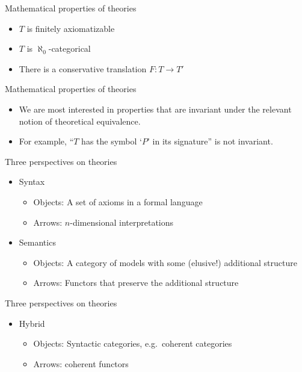\documentclass{beamer}
\begin{document}
\begin{frame}{Mathematical properties of theories}

  \begin{itemize}
  \item $T$ is finitely axiomatizable  
  \item $T$ is $\aleph _0$-categorical
  \item There is a conservative translation $F:T\to T'$
  \end{itemize}

\end{frame}

\begin{frame}{Mathematical properties of theories}

  \begin{itemize}
  \item We are most interested in properties that are invariant under
    the relevant notion of theoretical equivalence.
  \item For example, ``$T$ has the symbol `$P$' in its signature'' is
    not invariant.
  \end{itemize}

\end{frame}

\begin{frame}{Three perspectives on theories}

  \begin{itemize}
  \item Syntax
    \begin{itemize}
    \item Objects: A set of axioms in a formal language
    \item Arrows: $n$-dimensional interpretations
    \end{itemize}  
  \item Semantics
    \begin{itemize}
    \item Objects: A category of models with some (elusive!)
      additional structure
    \item Arrows: Functors that preserve the additional structure
    \end{itemize}
  \end{itemize}

\end{frame}  

\begin{frame}{Three perspectives on theories}

    \begin{itemize}
    \item Hybrid
      \begin{itemize}
      \item Objects: Syntactic categories, e.g.\ coherent categories
      \item Arrows: coherent functors
      \end{itemize}
    \end{itemize}
      
\end{frame}
\end{document}

